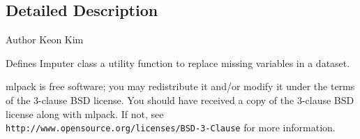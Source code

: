 \subsection{Detailed Description}
\begin{DoxyAuthor}{Author}
Keon Kim
\end{DoxyAuthor}
Defines Imputer class a utility function to replace missing variables in a dataset.

mlpack is free software; you may redistribute it and/or modify it under the terms of the 3-\/clause B\+SD license. You should have received a copy of the 3-\/clause B\+SD license along with mlpack. If not, see {\tt http\+://www.\+opensource.\+org/licenses/\+B\+S\+D-\/3-\/\+Clause} for more information. 